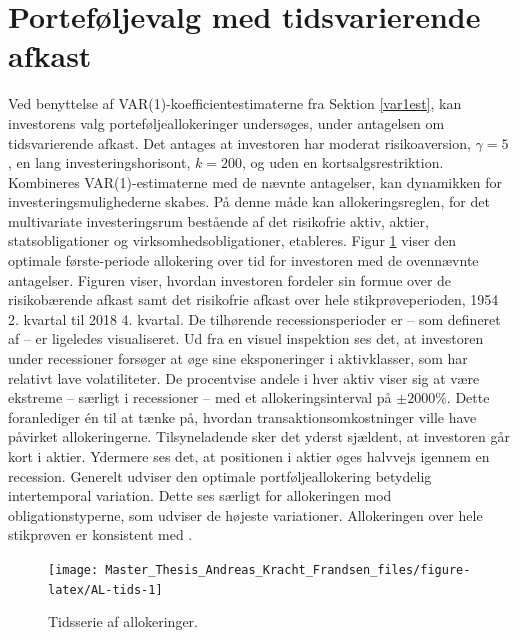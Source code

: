 \documentclass[
  a4paper,
  oneside]{memoir}
\begin{document}
\hypertarget{portvalgmedtids}{%
\section{Porteføljevalg med tidsvarierende afkast}\label{portvalgmedtids}}

Ved benyttelse af VAR(1)-koefficientestimaterne fra Sektion \ref{var1est}, kan investorens valg porteføljeallokeringer undersøges, under antagelsen om tidsvarierende afkast. Det antages at investoren har moderat risikoaversion, \(\gamma=5\), en lang investeringshorisont, \(k=200\), og uden en kortsalgsrestriktion. Kombineres VAR(1)-estimaterne med de nævnte antagelser, kan dynamikken for investeringsmulighederne skabes. På denne måde kan allokeringsreglen, for det multivariate investeringsrum bestående af det risikofrie aktiv, aktier, statsobligationer og virksomhedsobligationer, etableres. Figur \ref{fig:AL-tids} viser den optimale første-periode allokering over tid for investoren med de ovennævnte antagelser. Figuren viser, hvordan investoren fordeler sin formue over de risikobærende afkast samt det risikofrie afkast over hele stikprøveperioden, 1954 2. kvartal til 2018 4. kvartal. De tilhørende recessionsperioder er -- som defineret af \citep{NBER2020} -- er ligeledes visualiseret. Ud fra en visuel inspektion ses det, at investoren under recessioner forsøger at øge sine eksponeringer i aktivklasser, som har relativt lave volatiliteter. De procentvise andele i hver aktiv viser sig at være ekstreme -- særligt i recessioner -- med et allokeringsinterval på \(\pm 2000\%\). Dette foranlediger én til at tænke på, hvordan transaktionsomkostninger ville have påvirket allokeringerne. Tilsyneladende sker det yderst sjældent, at investoren går kort i aktier. Ydermere ses det, at positionen i aktier øges halvvejs igennem en recession. Generelt udviser den optimale portføljeallokering betydelig intertemporal variation. Dette ses særligt for allokeringen mod obligationstyperne, som udviser de højeste variationer. Allokeringen over hele stikprøven er konsistent med \citep{JurVic2011}.

\begin{figure}[H]

{\centering \texttt{[image: Master\_Thesis\_Andreas\_Kracht\_Frandsen\_files/figure-latex/AL-tids-1]} 

}

\caption{Tidsserie af allokeringer.}\label{fig:AL-tids}
\end{figure}
\end{document}

